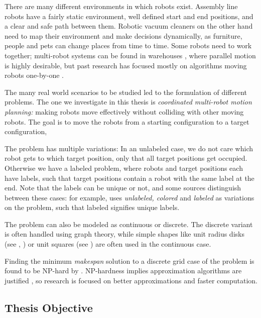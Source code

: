 There are many different environments in which robots exist. 
Assembly line robots have a fairly static environment, well defined start and end positions, and a clear and safe path between them.
Robotic vacuum cleaners on the other hand need to map their environment and make decisions dynamically, as furniture, people and pets can change places from time to time. 
Some robots need to work together; multi-robot systems can be found in warehouses \cite{sicilianoSpringerHandbookRobotics2016}, where parallel motion is highly desirable, but past research has focused mostly on algorithms moving robots one-by-one \cite{demaineCoordinatedMotionPlanning2019}.

The many real world scenarios to be studied led to the formulation of different problems.
The one we investigate in this thesis is \emph{coordinated multi-robot motion planning:} making robots move effectively without colliding with other moving robots.
The goal is to move the robots from a starting configuration to a target configuration, 

The problem has multiple variations: 
In an unlabeled case, we do not care which robot gets to which target position, only that all target positions get occupied. 
Otherwise we have a labeled problem, where robots and target positions each have labels, such that target positions contain a robot with the same label at the end. 
Note that the labels can be unique or not, and some sources distinguish between these cases: for example, \cite{demaineCoordinatedMotionPlanning2019} uses \emph{unlabeled, colored} and \emph{labeled} as variations on the problem, such that labeled signifies unique labels.

The problem can also be modeled as continuous or discrete. The discrete variant is often handled using graph theory, while simple shapes like unit radius disks (see \cite{demaineCoordinatedMotionPlanning2019}, \cite{banyassadyUnlabeledMultiRobotMotion2022}) or unit squares (see \cite{yangCoordinatedPathPlanning2022}) are often used in the continuous case. 

Finding the minimum \emph{makespan} solution to a discrete grid case of the problem is found to be NP-hard by \cite{demaineCoordinatedMotionPlanning2019}.
NP-hardness implies approximation algorithms are justified \cite{demaineCoordinatedMotionPlanning2019}, so research is focused on better approximations and faster computation. 

\subsection{Thesis Objective}

